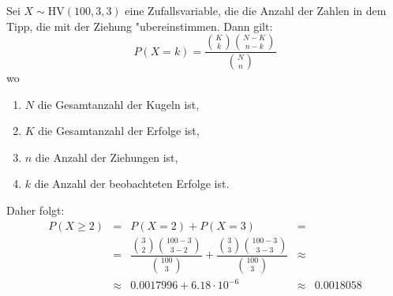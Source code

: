 \begin{enumerate}[(a)]
        Sei $X \sim \text{HV}(100, 3, 3)$ eine Zufallsvariable, die die
        Anzahl der Zahlen in dem Tipp, die mit der Ziehung "ubereinstimmen.
        Dann gilt:
        \begin{equation}
            P(X = k) = \dfrac{\binom{K}{k}\binom{N - K}{n - k}}{\binom{N}{n}}
        \end{equation}
        wo
        \begin{enumerate}[-]
            \item $N$ die Gesamtanzahl der Kugeln ist,
            \item $K$ die Gesamtanzahl der Erfolge ist,
            \item $n$ die Anzahl der Ziehungen ist,
            \item $k$ die Anzahl der beobachteten Erfolge ist.
        \end{enumerate}
        \vspace{5pt}
        Daher folgt:
        \begin{equation*}
            \begin{array}{rcccl}
                P(X \geq 2) &=& P(X = 2) + P(X = 3) &=& \\[7.5pt]
                            &=& \dfrac{\binom{3}{2}\binom{100 - 3}{3 - 2}}{\binom{100}{3}} + \dfrac{\binom{3}{3}\binom{100 - 3}{3 - 3}}{\binom{100}{3}} &\approx& \\[15pt]
                      &\approx& 0.0017996 + 6.18 \cdot 10^{-6} &\approx& 0.0018058
            \end{array}
        \end{equation*}
\end{enumerate}
